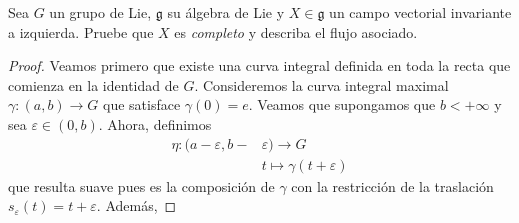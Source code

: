 \documentclass[11pt]{article}
\newcommand{\paint}[1]{\color{color}{#1}}
\newenvironment{exercise}[2][Ejercicio]{\begin{trivlist}
\item[\hskip \labelsep \paint{{\bfseries #1}}\hskip \labelsep {\bfseries #2.}]}{\end{trivlist}}
\begin{document}
\begin{exercise}{8} Sea $G$ un grupo de Lie, $\mathfrak{g}$ su \'algebra de Lie y $X\in\mathfrak{g}$ un campo vectorial invariante a izquierda. Pruebe que $X$ es \emph{completo} y describa el flujo asociado.
\end{exercise}
\begin{proof} Veamos primero que existe una curva integral definida en toda la recta que comienza en la identidad de $G$. Consideremos la curva integral maximal $\gamma : (a,b) \to G$ que satisface $\gamma(0) = e$. Veamos que supongamos que $b < +\infty$ y sea $\varepsilon \in (0,b)$. Ahora, definimos
\begin{align*}
\eta  : (a-\varepsilon,b-&\varepsilon) \to G\\
&t \longmapsto \gamma(t+\varepsilon)
\end{align*}
que resulta suave pues es la composici\'on de $\gamma$ con la restricci\'on de la traslaci\'on $s_\varepsilon(t) = t + \varepsilon$. Adem\'as, 
\end{proof}
\end{document}
